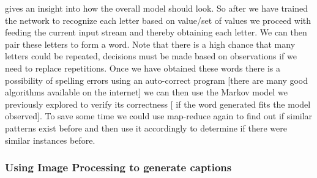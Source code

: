 \documentclass[sigconf]{acmart}
\begin{document}
gives an insight into how the overall model should look. So after we have trained the network to recognize each letter based on value/set of values we proceed with feeding the current input stream and thereby obtaining each letter. We can then pair these letters to form a word. Note that there is a high chance that many letters could be repeated, decisions must be made based on observations if we need to replace repetitions. Once we have obtained these words there is a possibility of spelling errors using an auto-correct program [there are many good algorithms available on the internet] we can then use the Markov model we previously explored to verify its correctness [ if the word generated fits the model observed]. To save some time we could use map-reduce again to find out if similar patterns exist before and then use it accordingly to determine if there were similar instances before.

\subsubsection{Using Image Processing to generate captions}
\end{document}
